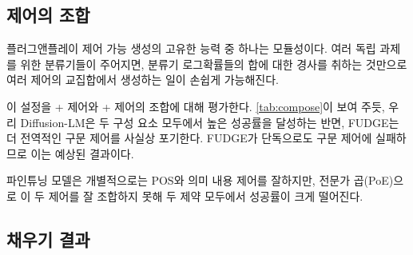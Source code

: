 \documentclass{article}
\begin{document}
\subsection{제어의 조합}
\label{ssec:compose}
\begin{table}
    \centering
\caption{\label{tab:compose} 본 실험에서는 의미 제어와 구문 제어를 조합한다. Diffusion-LM은 유창성(\fluency)을 다소 양보하며 더 높은 성공률(\success)을 달성한다. 본 방법은 제어 성공률에서 FUDGE와 FT-PoE(두 파인튜닝 모델의 전문가 곱(product of experts)) 모두를 능가하며, 특히 구조화된 구문 제어(즉, 구문 파스 트리와 POS)에서 격차가 크다.
}
\end{table}


플러그앤플레이 제어 가능 생성의 고유한 능력 중 하나는 모듈성이다. 여러 독립 과제를 위한 분류기들이 주어지면, 분류기 로그확률들의 합에 대한 경사를 취하는 것만으로 여러 제어의 교집합에서 생성하는 일이 손쉽게 가능해진다.


이 설정을 \Content + \Syntax 제어와 \Content + \POS 제어의 조합에 대해 평가한다.
\cref{tab:compose}이 보여 주듯, 우리 Diffusion-LM은 두 구성 요소 모두에서 높은 성공률을 달성하는 반면, FUDGE는 더 전역적인 구문 제어를 사실상 포기한다. FUDGE가 단독으로도 구문 제어에 실패하므로 이는 예상된 결과이다.

파인튜닝 모델은 개별적으로는 POS와 의미 내용 제어를 잘하지만, 전문가 곱(PoE)으로 이 두 제어를 잘 조합하지 못해 두 제약 모두에서 성공률이 크게 떨어진다.


 

\subsection{채우기 결과}
\label{ssec:infill}
\end{document}
